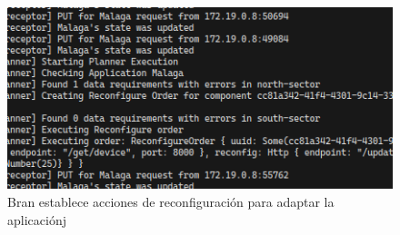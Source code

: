 \begin{figure}[H]
    \centering
    \caption{Bran establece acciones de reconfiguración para adaptar la aplicaciónj}
    \label{fig:BranPlan3}
    \includegraphics[width=\linewidth]{images/BranReconfiguring.png}
    \vspace{-4mm}
\end{figure}



